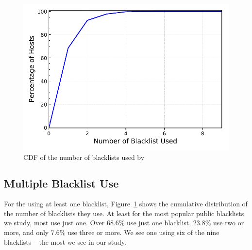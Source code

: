 


\begin{figure}[t]
  \centering
  \includegraphics[width=0.8\linewidth]{data_usage/images/perfect_shared_cdf_v2.pdf}
  \caption{CDF of the number of blacklists used by {}}
  \label{fig:perfect-shared-cdf}
\end{figure}

\subsection{Multiple Blacklist Use}

For the {} using at least one blacklist,
Figure~\ref{fig:perfect-shared-cdf} shows the cumulative distribution
of the number of blacklists they use.  At least for the most popular
public blacklists we study, most use just one.  Over 68.6\% use just
one blacklist, 23.8\% use two or more, and only 7.6\% use three or more.
We see one {} using six of the nine blacklists -- the most
we see in our study.

